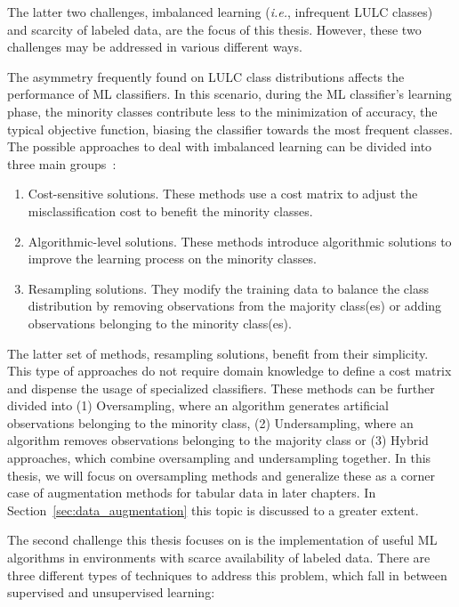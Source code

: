 The latter two challenges, imbalanced learning (\textit{i.e.}, infrequent LULC
classes) and scarcity of labeled data, are the focus of this thesis. However,
these two challenges may be addressed in various different ways.

The asymmetry frequently found on LULC class distributions affects the
performance of ML classifiers. In this scenario, during the ML classifier's
learning phase, the minority classes contribute less to the minimization of
accuracy, the typical objective function, biasing the classifier towards the
most frequent classes. The possible approaches to deal with imbalanced
learning can be divided into three main groups~\cite{Fernandez2013}: 

\begin{enumerate}
    \item Cost-sensitive solutions. These methods use a cost matrix to adjust
        the misclassification cost to benefit the minority classes.
    \item Algorithmic-level solutions. These methods introduce algorithmic
        solutions to improve the learning process on the minority classes. 
    \item Resampling solutions. They modify the training data to balance the
        class distribution by removing observations from the majority
        class(es) or adding observations belonging to the minority class(es).
\end{enumerate}

The latter set of methods, resampling solutions, benefit from their
simplicity. This type of approaches do not require domain knowledge to define
a cost matrix and dispense the usage of specialized classifiers. These methods
can be further divided into (1) Oversampling, where an algorithm generates
artificial observations belonging to the minority class, (2) Undersampling,
where an algorithm removes observations belonging to the majority class or (3)
Hybrid approaches, which combine oversampling and undersampling together. In
this thesis, we will focus on oversampling methods and generalize these as a
corner case of augmentation methods for tabular data in later chapters. In
Section~\ref{sec:data_augmentation} this topic is discussed to a greater
extent.

The second challenge this thesis focuses on is the implementation of useful ML
algorithms in environments with scarce availability of labeled data. There are
three different types of techniques to address this problem, which fall in
between supervised and unsupervised learning:

